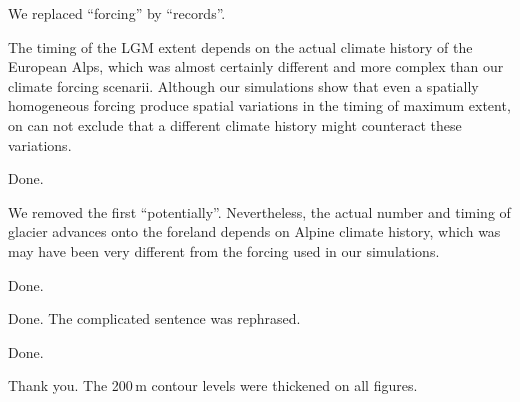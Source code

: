 
    We replaced ``forcing'' by ``records''.


    The timing of the LGM extent depends on the actual climate history of the
    European Alps, which was almost certainly different and more complex than
    our climate forcing scenarii.  Although our simulations show that even a
    spatially homogeneous forcing produce spatial variations in the timing of
    maximum extent, on can not exclude that a different climate history might
    counteract these variations.


    Done.


    We removed the first ``potentially''. Nevertheless, the actual number and
    timing of glacier advances onto the foreland depends on Alpine climate
    history, which was may have been very different from the forcing used in
    our simulations.


    Done.


    Done. The complicated sentence was rephrased.


    Done.


    Thank you. The 200\,m contour levels were thickened on all figures.







